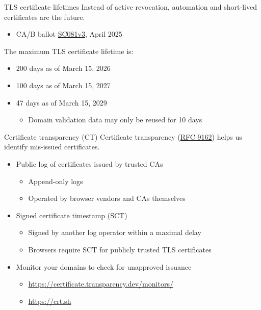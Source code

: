 \begin{frame}{TLS certificate lifetimes}
  Instead of active revocation, automation and short-lived certificates are the future.
  \begin{itemize}
    \item CA/B ballot \href{https://cabforum.org/2025/04/11/ballot-sc081v3-introduce-schedule-of-reducing-validity-and-data-reuse-periods/}{SC081v3}, April 2025
  \end{itemize}

  \vspace*{1em}

  \pause
  The maximum TLS certificate lifetime is:
  \begin{itemize}
    \item 200 days as of March 15, 2026
    \item 100 days as of March 15, 2027
    \item 47 days as of March 15, 2029
    \par
    \begin{itemize}[<+(1)->]
      \item Domain validation data may only be reused for 10 days
    \end{itemize}
  \end{itemize}
\end{frame}

\begin{frame}{Certificate transparency (CT)}
  Certificate transparency (\href{https://datatracker.ietf.org/doc/html/rfc9162}{RFC 9162}) helps us identify mis-issued certificates.
  \begin{itemize}[<+(1)->]
    \item Public log of certificates issued by trusted CAs
    \par
    \begin{itemize}
      \item Append-only logs
      \item Operated by browser vendors and CAs themselves
    \end{itemize}
    \item Signed certificate timestamp (SCT)
    \begin{itemize}
      \item Signed by another log operator within a maximal delay
      \item Browsers require SCT for publicly trusted TLS certificates
    \end{itemize}
    \item Monitor your domains to check for unapproved issuance
    \begin{itemize}
      \item {\scriptsize{\url{https://certificate.transparency.dev/monitors/}}}
      \item {\scriptsize{\url{https://crt.sh}}}
    \end{itemize}
  \end{itemize}
\end{frame}

